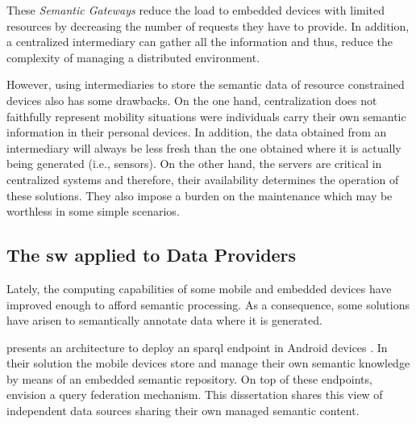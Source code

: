 These \emph{Semantic Gateways} reduce the load to embedded devices with limited resources by decreasing the number of requests they have to provide.
In addition, a centralized intermediary can gather all the information and thus, reduce the complexity of managing a distributed environment.

However, using intermediaries to store the semantic data of resource constrained devices also has some drawbacks.
On the one hand, centralization does not faithfully represent mobility situations were individuals carry their own semantic information in their personal devices.
In addition, the data obtained from an intermediary will always be less fresh than the one obtained where it is actually being generated (i.e., sensors).
On the other hand, the servers are critical in centralized systems and therefore, their availability determines the operation of these solutions.
They also impose a burden on the maintenance which may be worthless in some simple scenarios.



\subsection{The \acl{sw} applied to Data Providers}
\label{sec:sw_providers}

Lately, the computing capabilities of some mobile and embedded devices have improved enough to afford semantic processing. %
As a consequence, some solutions have arisen to semantically annotate data where it is generated. %


\citet{daquin_enabling_2011} presents an architecture to deploy an \acs{sparql}  endpoint in Android devices .
In their solution the mobile devices store and manage their own semantic knowledge by means of an embedded semantic repository.
On top of these endpoints, \citeauthor{daquin_enabling_2011} envision a query federation mechanism.
This dissertation shares this view of independent data sources sharing their own managed semantic content. %



